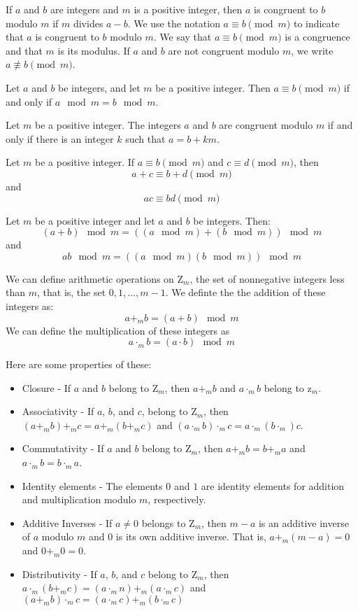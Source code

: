\documentclass[../discrete.tex]{subfiles}
\begin{document}
\begin{definition}
    If $a$ and $b$ are integers and $m$ is a positive integer, then $a$ is congruent to $b$ modulo $m$ 
    if $m$ divides $a-b$. We use the notation $a\equiv b\pmod m$ to indicate that $a$ is congruent to $b$ modulo $m$.
    We say that $a\equiv b \pmod m$ is a congruence and that $m$ is its modulus. If $a$ and $b$ are not congruent modulo $m$,
    we write $a\not\equiv b\pmod m$.
\end{definition}

\begin{theorem}
    Let $a$ and $b$ be integers, and let $m$ be a positive integer. Then $a\equiv b\pmod m$ if and 
    only if $a\mod m = b \mod m$.
\end{theorem}

\begin{theorem}
    Let $m$ be a positive integer. The integers $a$ and $b$ are congruent modulo $m$
    if and only if there is an integer $k$ such that $a=b+km$.
\end{theorem}

\begin{theorem}
    Let $m$ be a positive integer. If $a\equiv b\pmod m$ and $c\equiv d\pmod m$, then
    \[a+c\equiv b+d\pmod m\] and
    \[ac\equiv bd\pmod m\]
\end{theorem}

\begin{corollary}
    Let $m$ be a positive integer and let $a$ and $b$ be integers. Then:
    \[(a+b)\mod m = ((a\mod m)+(b\mod m))\mod m\]
    and 
    \[ab\mod m = ((a\mod m)(b\mod m))\mod m\]
\end{corollary}

We can define arithmetic operations on $\mathrm{Z}_m$, the set of nonnegative integers less than $m$,
that is, the set ${0,1,\dots, m-1}$. We definte the the addition of these integers as:
\[a+_mb=(a+b)\mod m\]
We can define the multiplication of these integers as 
\[a\cdot_m b=(a\cdot b)\mod m\]

Here are some properties of these:
\begin{itemize}
    \item Closure - If $a$ and $b$ belong to $\mathrm{Z}_m$, then $a+_m b$ and $a \cdot_m b$ belong to $\mathrm{z}_m$.
    \item Associativity - If $a$, $b$, and $c$, belong to $\mathrm{Z}_m$, then $(a+_m b)+_m c = a +_m (b+_m c)$ and $(a\cdot_m b)\cdot_m c = a\cdot_m(b\cdot_m)c$.
    \item Commutativity - If $a$ and $b$ belong to $\mathrm{Z}_m$, then $a+_m b = b+_m a$ and $a\cdot_m b = b\cdot_m a$.
    \item Identity elements - The elements $0$ and $1$ are identity elements for addition and multiplication modulo $m$, respectively.
    \item Additive Inverses - If $a\neq 0$ belongs to $\mathrm{Z}_m$, then $m-a$ is an additive inverse of $a$ modulo $m$ and 0 is its own additive inverse. That is, $a+_m(m-a)=0$ and $0+_m0=0$.
    \item Distributivity - If $a$, $b$, and $c$ belong to $\mathrm{Z}_m$, then $a\cdot_m(b+_mc)=(a\cdot_m n)+_m(a\cdot_m c)$ and $(a+_m b)\cdot_m c = (a\cdot_mc)+_m(b\cdot_m c)$
\end{itemize}
\end{document}
